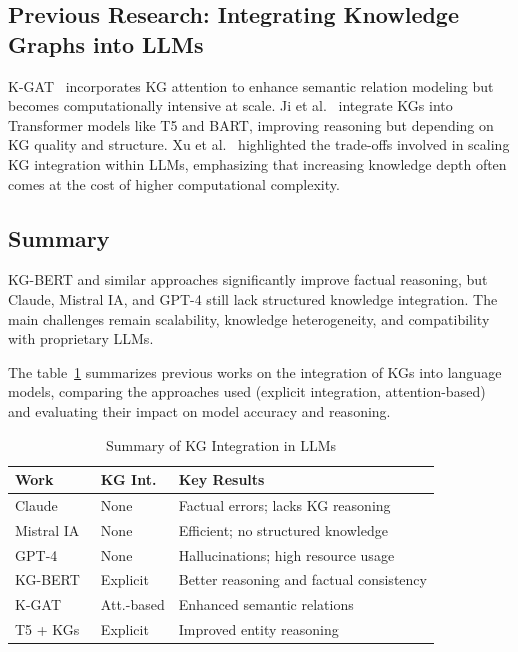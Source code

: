 \documentclass[conference]{IEEEtran}
\begin{document}
\subsection{Previous Research: Integrating Knowledge Graphs into LLMs}

K-GAT~\cite{vashishth2020} incorporates KG attention to enhance semantic relation modeling but becomes computationally intensive at scale. Ji et al.~\cite{ji2021} integrate KGs into Transformer models like T5 and BART, improving reasoning but depending on KG quality and structure. Xu et al.~\cite{xu2021} highlighted the trade-offs involved in scaling KG integration within LLMs, emphasizing that increasing knowledge depth often comes at the cost of higher computational complexity.

\subsection{Summary}

KG-BERT and similar approaches significantly improve factual reasoning, but Claude, Mistral IA, and GPT-4 still lack structured knowledge integration. The main challenges remain scalability, knowledge heterogeneity, and compatibility with proprietary LLMs.

The table~\ref{table:summary_kg_integration} summarizes previous works on the integration of KGs into language models, comparing the approaches used (explicit integration, attention-based) and evaluating their impact on model accuracy and reasoning.


\begin{table}[h!]
\caption{Summary of KG Integration in LLMs}
\centering
\small
\setlength{\tabcolsep}{4pt}
\begin{tabular}{|p{1.8cm}|p{1.4cm}|p{3.6cm}|}
\hline
\textbf{Work} & \textbf{KG Int.} & \textbf{Key Results} \\ \hline
Claude~\cite{anthropic2023} & None & Factual errors; lacks KG reasoning \\ \hline
Mistral IA~\cite{mistral2023} & None & Efficient; no structured knowledge \\ \hline
GPT-4~\cite{openai2023} & None & Hallucinations; high resource usage \\ \hline
KG-BERT~\cite{yao2019} & Explicit & Better reasoning and factual consistency \\ \hline
K-GAT~\cite{vashishth2020} & Att.-based & Enhanced semantic relations \\ \hline
T5 + KGs~\cite{ji2021} & Explicit & Improved entity reasoning \\ \hline
\end{tabular}
\label{table:summary_kg_integration}
\end{table}
\end{document}
